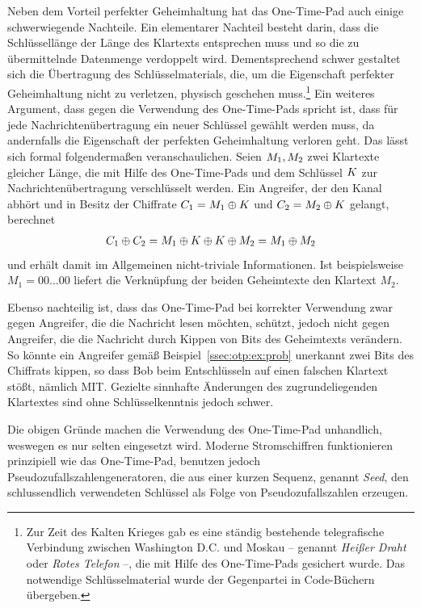 Neben dem Vorteil perfekter Geheimhaltung hat das One-Time-Pad auch
einige schwerwiegende Nachteile. Ein elementarer Nachteil besteht darin,
dass die Schlüssellänge der Länge des Klartexts entsprechen muss und so
die zu übermittelnde Datenmenge verdoppelt wird. Dementsprechend schwer
gestaltet sich die Übertragung des Schlüsselmaterials, die, um die
Eigenschaft perfekter Geheimhaltung nicht zu verletzen, physisch
geschehen muss.\footnote{Zur Zeit des Kalten Krieges gab es eine ständig
  bestehende telegrafische Verbindung zwischen Washington D.C. und
  Moskau -- genannt \emph{Heißer Draht} oder \emph{Rotes Telefon} --,
  die mit Hilfe des One-Time-Pads gesichert wurde. Das notwendige
  Schlüsselmaterial wurde der Gegenpartei in Code-Büchern übergeben.} 
Ein weiteres Argument, dass gegen die Verwendung des One-Time-Pads
spricht ist, dass für jede Nachrichtenübertragung ein neuer Schlüssel
gewählt werden muss, da andernfalls die Eigenschaft der perfekten
Geheimhaltung verloren geht. Das lässt sich formal folgendermaßen
veranschaulichen. Seien $M_{1}, M_{2}$ zwei Klartexte
gleicher Länge, die mit Hilfe des One-Time-Pads und dem Schlüssel $K$
zur Nachrichtenübertragung verschlüsselt werden. Ein Angreifer, der den
Kanal abhört und in Besitz der Chiffrate $C_{1} = M_{1}
\oplus K$ und $C_{2} = M_{2} \oplus K$ gelangt,
berechnet 
\begin{align*}
  C_{1} \oplus C_{2} = M_{1} \oplus K \oplus K
  \oplus M_{2} = M_{1} \oplus M_{2} 
\end{align*}
und erhält damit im Allgemeinen nicht-triviale Informationen. Ist
beispielsweise $M_{1} = 00\dots00$ liefert die Verknüpfung der beiden
Geheimtexte den Klartext $M_{2}$.  

Ebenso nachteilig ist, dass das One-Time-Pad bei korrekter Verwendung
zwar gegen Angreifer, die die Nachricht lesen möchten, schützt, jedoch
nicht gegen Angreifer, die die Nachricht durch Kippen von Bits des
Geheimtexts verändern. So könnte ein Angreifer gemäß
Beispiel~\ref{ssec:otp:ex:prob} unerkannt zwei Bits des Chiffrats
kippen, so dass Bob beim Entschlüsseln auf einen falschen Klartext
stößt, nämlich MIT. Gezielte sinnhafte Änderungen des zugrundeliegenden
Klartextes sind ohne Schlüsselkenntnis jedoch schwer.  

Die obigen Gründe machen die Verwendung des One-Time-Pad unhandlich,
weswegen es nur selten eingesetzt wird. Moderne Stromschiffren
funktionieren prinzipiell wie das One-Time-Pad, benutzen jedoch
Pseudozufallszahlengeneratoren\indexPRNG, die aus einer kurzen Sequenz,
genannt \emph{Seed}\indexSeed, den schlussendlich verwendeten Schlüssel
als Folge von Pseudozufallszahlen erzeugen. 

